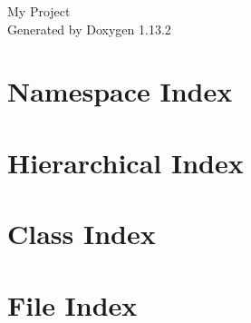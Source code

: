 \documentclass[twoside]{book}
\newcommand{\+}{\discretionary{\mbox{\scriptsize$\hookleftarrow$}}{}{}}
\newcommand{\clearemptydoublepage}{%
    \newpage{\pagestyle{empty}\cleardoublepage}%
  }
\begin{document}
  \raggedbottom
    \hypersetup{pageanchor=false,
                bookmarksnumbered=true,
                pdfencoding=unicode
               }
  \begin{titlepage}
  \vspace*{7cm}
  \begin{center}%
  {\Large My Project}\\
  \vspace*{1cm}
  {\large Generated by Doxygen 1.13.2}\\
  \end{center}
  \end{titlepage}
  \clearemptydoublepage
  \tableofcontents
  \clearemptydoublepage
  \hypersetup{pageanchor=true}




\chapter{Namespace Index}

\chapter{Hierarchical Index}

\chapter{Class Index}

\chapter{File Index}

\end{document}
